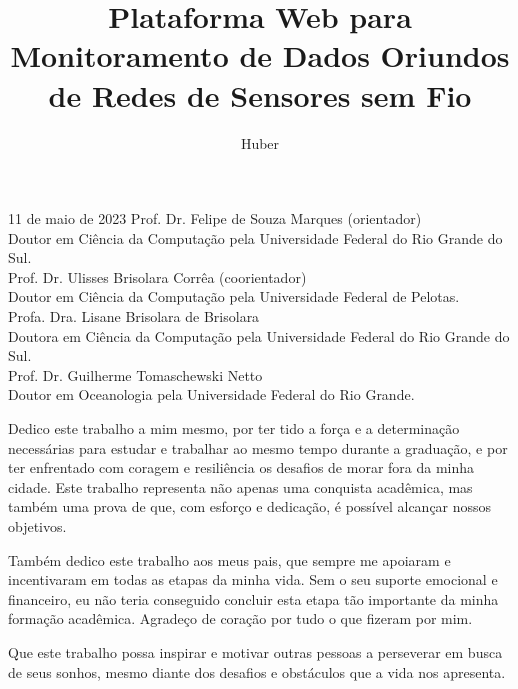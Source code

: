 \documentclass[tcc,capa]{texufpel}
\title{Plataforma Web para Monitoramento de Dados Oriundos de Redes de Sensores sem Fio}
\author{Huber}{Mathaus Corrêa}
\begin{document}
\renewcommand{\advisorname}{Orientador}           %
\renewcommand{\coadvisorname}{Coorientador}      %

\maketitle 

\sloppy




\begin{aprovacao}{11 de maio de 2023} %
    \noindent Prof. Dr. Felipe de Souza Marques (orientador)\\
Doutor em Ciência da Computação pela Universidade Federal do Rio Grande do Sul.\\[1cm]

\noindent Prof. Dr. Ulisses Brisolara Corrêa (coorientador)\\
Doutor em Ciência da Computação pela Universidade Federal de Pelotas.\\[1cm]

\noindent Profa. Dra. Lisane Brisolara de Brisolara \\
Doutora em Ciência da Computação pela Universidade Federal do Rio Grande do Sul.\\[1cm]

\noindent Prof. Dr. Guilherme Tomaschewski Netto \\
Doutor em Oceanologia pela Universidade Federal do Rio Grande.\\[1cm]


\end{aprovacao}

\begin{dedicatoria}
  Dedico este trabalho a mim mesmo, por ter tido a força e a determinação necessárias para estudar e trabalhar ao mesmo tempo durante a graduação, e por ter enfrentado com coragem e resiliência os desafios de morar fora da minha cidade. Este trabalho representa não apenas uma conquista acadêmica, mas também uma prova de que, com esforço e dedicação, é possível alcançar nossos objetivos.

Também dedico este trabalho aos meus pais, que sempre me apoiaram e incentivaram em todas as etapas da minha vida. Sem o seu suporte emocional e financeiro, eu não teria conseguido concluir esta etapa tão importante da minha formação acadêmica. Agradeço de coração por tudo o que fizeram por mim.

Que este trabalho possa inspirar e motivar outras pessoas a perseverar em busca de seus sonhos, mesmo diante dos desafios e obstáculos que a vida nos apresenta.
\end{dedicatoria}
\end{document}
